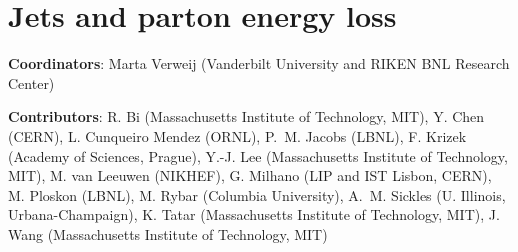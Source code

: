 \documentclass[../report.tex]{subfiles}
\providecommand{\main}{..}
\begin{document}
\section{Jets and parton energy loss}\label{sec:HI_Jets}

{ \small
  \noindent \textbf{Coordinators}: Marta Verweij (Vanderbilt University and RIKEN BNL Research Center)
  
  \noindent \textbf{Contributors}:
R. Bi (Massachusetts Institute of Technology, MIT),
Y. Chen (CERN),
L. Cunqueiro Mendez (ORNL),
P.~M. Jacobs (LBNL),
F. Krizek (Academy of Sciences, Prague),
Y.-J. Lee (Massachusetts Institute of Technology, MIT),
M. van Leeuwen (NIKHEF),
G. Milhano (LIP and IST Lisbon, CERN),
M. Ploskon (LBNL),
M. Rybar (Columbia University),
A.~M. Sickles (U. Illinois, Urbana-Champaign),
K. Tatar (Massachusetts Institute of Technology, MIT),
J. Wang  (Massachusetts Institute of Technology, MIT)
}



\newpage

\newpage

\newpage


\end{document}
